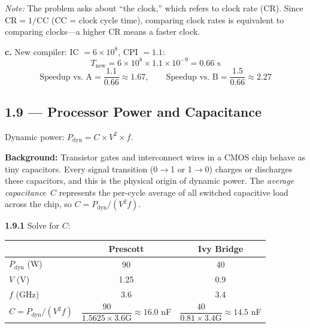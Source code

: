 \smallskip\noindent\textit{Note:} The problem asks about ``the clock,'' which refers
to clock rate (CR).  Since $\text{CR} = 1/\text{CC}$ (CC = clock cycle time),
comparing clock rates is equivalent to comparing clocks---a higher CR means a
faster clock.

\medskip\noindent\textbf{c.} New compiler: IC $= 6 \times 10^8$, CPI $= 1.1$:
\[
  T_{\text{new}} = 6 \times 10^8 \times 1.1 \times 10^{-9} = 0.66\text{ s}
\]
\[
  \text{Speedup vs.\ A} = \frac{1.1}{0.66} \approx 1.67, \qquad
  \text{Speedup vs.\ B} = \frac{1.5}{0.66} \approx 2.27
\]

\subsection*{1.9 --- Processor Power and Capacitance}
\hypertarget{sol-1.9}{}

Dynamic power: $P_{\text{dyn}} = C \times V^2 \times f$.

\begin{flushright}
\begin{minipage}{0.85\linewidth}
\scriptsize
\textbf{Background:}\quad
Transistor gates and interconnect wires in a CMOS chip behave as tiny
capacitors. Every signal transition (0$\to$1 or 1$\to$0) charges or
discharges these capacitors, and this is the physical origin of dynamic
power. The \emph{average capacitance}~$C$ represents the per-cycle average
of all switched capacitive load across the chip, so
$C = P_{\mathrm{dyn}}/(V^{2}\!f)$.
\end{minipage}
\end{flushright}
\medskip

\medskip\noindent\textbf{1.9.1} Solve for $C$:

\begin{center}
\begin{tabular}{lcc}
\toprule
& Prescott & Ivy Bridge \\
\midrule
$P_{\text{dyn}}$ (W)  & 90   & 40 \\
$V$ (V)                & 1.25 & 0.9 \\
$f$ (GHz)              & 3.6  & 3.4 \\
\midrule
$C = P_{\text{dyn}}/(V^2 f)$ & $\dfrac{90}{1.5625 \times 3.6\text{G}}
  \approx 16.0$ nF & $\dfrac{40}{0.81 \times 3.4\text{G}} \approx 14.5$ nF \\
\bottomrule
\end{tabular}
\end{center}

